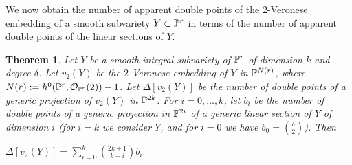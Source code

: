 \documentclass{amsart}
\newtheorem{theorem}{Theorem}
\theoremstyle{definition}
\begin{document}
We now obtain the number of apparent double points of the
$2$-Veronese embedding of a smooth subvariety $Y\subset\Bbb{P}^{r}$ in terms of
the number of apparent double points of the linear sections of $Y$.

\begin{theorem}\label{formula}
Let $Y$ be a smooth integral subvariety of $\Bbb{P} ^{r}$ of
dimension $k$ and degree $\delta$. Let $v_{2}(Y)$ be the
$2$-Veronese embedding of $Y$ in $\Bbb{P}^{N(r)}$, where
$N(r):=h^{0}(\Bbb{P}^{r},\mathcal{O}_{\Bbb{P}^{r}}(2))-1$. Let
$\Delta [v_{2}(Y)]$ be the number of double points of a generic
projection of $v_{2}(Y)$ in $\Bbb{P}^{2k}$. For $i=0,\dots,k$, let
$b_{i}$ be the number of double points of a generic projection in
$\Bbb{P}^{2i}$ of a generic linear section of $Y$ of dimension $i$
(for $i=k$ we consider $Y$, and for $i=0$ we have
$b_{0}=\binom{\delta}{2}$). Then

\begin{center}
$\Delta [v_{2}(Y)]=\sum\limits_{i=0}^{k}\binom{2k+1}{k-i}b_{i}.$
\end{center}
\end{theorem}
\end{document}
